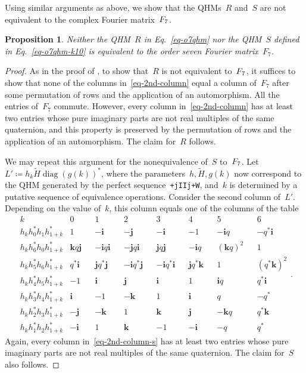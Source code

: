 \documentclass[12pt]{article}
\numberwithin{equation}{section}
\newtheorem{proposition}[theorem]{Proposition}
\newcommand{\qi}{\mathbf{i}}
\newcommand{\qj}{\mathbf{j}}
\newcommand{\qk}{\mathbf{k}}
\newcommand{\adjoint}{*}
\newcommand{\eqdef}{\coloneqq}
\DeclareMathOperator{\diag}{diag}
\newcommand{\tH}{\widetilde{H}}
\begin{document}
Using similar arguments as above, we show that the QHMs~$R$ and~$S$ are not equivalent to the complex Fourier matrix~$F_7 \mspace{0.7mu}$. 
\begin{proposition}
\label{prop-fourier-noneq}
Neither the QHM\/~$R$ in Eq.~\eqref{eq-o7qhm} nor the QHM\/~$S$ defined in Eq.~\eqref{eq-o7qhm-k10} is equivalent to the order seven Fourier matrix~$F_7$.
\end{proposition}
\begin{proof}
As in the proof of , to show that~$R$ is not equivalent to~$F_7\mspace{0.7mu}$, it suffices to show that none of the columns in~\eqref{eq-2nd-column} equal a column of~$F_7$ after some permutation of rows and the application of an automorphism. All the entries of~$F_7$ commute. However, every column in~\eqref{eq-2nd-column} has at least two entries whose pure imaginary parts are not real multiples of the same quaternion, and this property is preserved by the permutation of rows and the application of an automorphism. The claim for~$R$ follows.

We may repeat this argument for the nonequivalence of~$S$ to~$F_7 \mspace{0.7mu}$. Let~$L' \eqdef h_k \tH \diag(g(k))^\adjoint $, where the parameters~$h, \tH, g(k)$ now correspond to the QHM generated by the perfect sequence~\verb|+jIIj+W|, and~$k$ is determined by a putative sequence of equivalence operations. Consider the second column of~$L'$. Depending on the value of~$k$, this column equals one of the columns of the table
\begin{equation}
\label{eq-2nd-column-s}
\begin{array}{c|cccccccccccccc}
k & 0 && 1 && 2 && 3 && 4 && 5 && 6 \\
\hline
h_k h_{0}^* h_{1} h_{1+k}^*  & 1 && -\qi && -\qj  && -\qi  && -1  && -\qi q  && -q^* \qi  \\
h_k h_{6}^* h_{0} h_{1+k}^*  & \qk q \qj && -\qi q \qi  && -\qj q \qi  && \qj q \qj  && -\qi q  && (\qk q)^2  && 1  \\
h_k h_{5}^* h_{6} h_{1+k}^*  & q^* \qi && \qj q^* \qj  && -\qi q^* \qj  && -\qi q^* \qi  && \qj q^* \qk  && 1  &&  (q^* \qk)^2 \\
h_k h_{4}^* h_{5} h_{1+k}^*  & -1 && \qi && \qj  && \qi  && 1  && \qi q  && q^* \qi \\
h_k h_{3}^* h_{4} h_{1+k}^*  & \qi && -1  && -\qk  && 1  && \qi  && q  && -q^*  \\
h_k h_{2}^* h_{3} h_{1+k}^*  & -\qj && -\qk  && 1  && \qk  && \qj  && -\qk q  && q^* \qk  \\
h_k h_{1}^* h_{2} h_{1+k}^*  & -\qi && 1  && \qk  && -1  && -\qi  && -q  && q^* 
\end{array} .
\end{equation}
Again, every column in~\eqref{eq-2nd-column-s} has at least two entries whose pure imaginary parts are not real multiples of the same quaternion. The claim for~$S$ also follows.
\end{proof}
\end{document}
